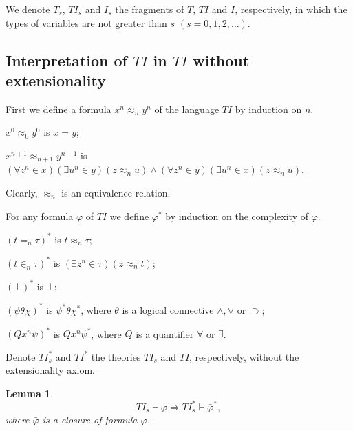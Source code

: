 \documentclass{asl}
\newtheorem{lemma}{Lemma}[section]
\theoremstyle{definition}
\begin{document}
We denote $T_s$, $TI_s$ and $I_s$ the fragments of $T$, $TI$ and $I$, respectively, in which the types of variables are not greater than $s$ $(s=0,1,2,\ldots)$. 

\subsection{Interpretation of $TI$ in $TI$ without extensionality}

First we define a formula $x^n\approx_n y^n$ of the language $TI$ by induction on $n$. 
\medskip

$x^0\approx_0 y^0$ is $x=y$;
\medskip

$x^{n+1}\approx_{n+1} y^{n+1}$ is $(\forall z^n\in x)(\exists u^n \in y)(z\approx_n u)\wedge (\forall z^n\in y)(\exists u^n \in x)(z\approx_n u)$.
\smallskip

Clearly, $\approx_{n}$ is an equivalence relation.

For any formula $\varphi$ of $TI$ we define $\varphi^*$ by induction on the complexity of $\varphi$.
\medskip

$(t =_n\tau)^*$ is $t \approx_n\tau$;
\medskip

$(t\in_n\tau)^*$ is $(\exists z^n\in \tau)(z\approx_n t)$;
\medskip

$(\bot)^*$ is $\bot$;
\medskip

$(\psi\theta \chi)^*$ is $\psi^*\theta \chi^*$, where $\theta$ is a logical connective $\wedge,\vee$ or $\supset$;
\medskip

$(Q x^n\psi)^*$ is $Q x^n\psi^*$, where $Q$ is a quantifier $\forall$ or $\exists$.
\medskip

Denote $TI_s^*$ and $TI^*$ the theories $TI_s$ and $TI$, respectively, without the extensionality axiom.

\begin{lemma}
\[TI_s\vdash\varphi \Rightarrow TI_s^*\vdash\bar{\varphi}^*,\]
where $\bar{\varphi}$ is a closure of formula $\varphi$.
\label{lemma:extensionality}
\end{lemma}
\end{document}
